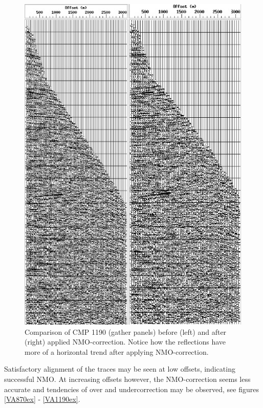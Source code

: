 \documentclass[10pt,a4paper]{article}
\begin{document}
\begin{figure}[H]
\includegraphics[width=\textwidth]{beforeAfter_NMOcorr_1190.jpg}
\caption{Comparison of CMP 1190 (gather panels) before (left) and after (right) applied NMO-correction. Notice how the reflections have more of a horizontal trend after applying NMO-correction.}
\label{NMO1190}
\end{figure}

\noindent Satisfactory alignment of the traces may be seen at low offsets, indicating successful NMO. At increasing offsets however, the NMO-correction seems less accurate and tendencies of over and undercorrection may be observed, see figures \ref{VA870ex} - \ref{VA1190ex}.
\end{document}
